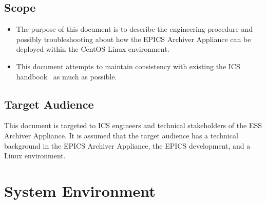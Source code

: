 \documentclass[11pt
  , a4paper
  , article
  , oneside
  , showtrims
]{memoir}
\begin{document}
\section{Scope}
\begin{itemize}
\item The purpose of this document is to describe the engineering procedure and possibly troubleshooting about how the EPICS Archiver Appliance can be deployed within the CentOS Linux environment. 
\item This document attempts to maintain consistency with existing the ICS handbook~\cite{ESS006763} as much as possible.
\end{itemize}

\section{Target Audience}
This document is targeted to ICS engineers and technical stakeholders of the ESS Archiver Appliance. It is assumed that the target audience has a technical background in the EPICS Archiver Appliance, the EPICS development, and a Linux environment.

\chapter{System Environment}


\end{document}
